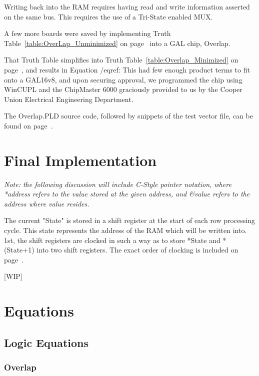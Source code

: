 \documentclass[letterpaper,titlepage,oneside]{article}
\begin{document}
Writing back into the RAM requires having read and write information asserted on the same bus. This requires the use of a Tri-State enabled MUX.

A few more boards were saved by implementing Truth Table~\ref{table:OverLap_Unminimized} on page~\pageref{table:OverLap_Unminimized}
 into a GAL chip, Overlap.
 
That Truth Table simplifies into Truth Table~\ref{table:Overlap_Minimized} on page~\pageref{table:Overlap_Minimized}, and results in Equation /eqref{}: 
This had few enough product terms to fit onto a GAL16v8, and upon securing approval, we programmed the chip using WinCUPL and the ChipMaster 6000 graciously provided to us by the Cooper Union Electrical Engineering Department.

The Overlap.PLD source code, followed by snippets of the test vector file, can be found on page~\pageref{code:Overlap}.

\clearpage

\section{Final Implementation}
\textit{Note: the following discussion will include C-Style pointer notation, where *address refers to the value stored at the given address, and \&value refers to the address where value resides.}

The current "State" is stored in a shift register at the start of each row processing cycle. This state represents the address of the RAM which will be written into. 1st, the shift registers are clocked in such a way as to store *State and *(State+1) into two shift registers. The exact order of clocking is included on page~\pageref{table:Clock}.

[WIP]

\section{Equations}
\subsection{Logic Equations}

\subsubsection{Overlap}
\end{document}
